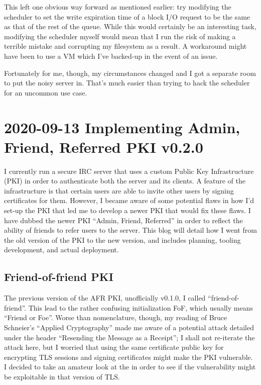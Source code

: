 \documentclass{article}
\begin{document}
This left one obvious way forward as mentioned earlier: try modifying the scheduler to set the write expiration time of a block I/O request to be the same as that of the rest of the queue.  While this would certainly be an interesting task, modifying the scheduler myself would mean that I run the risk of making a terrible mistake and corrupting my filesystem as a result.  A workaround might have been to use a VM which I've backed-up in the event of an issue.

Fortunately for me, though, my circumstances changed and I got a separate room to put the noisy server in.  That's much easier than trying to hack the scheduler for an uncommon use case.


\section{2020-09-13 Implementing Admin, Friend, Referred PKI v0.2.0}
I currently run a secure IRC server that uses a custom Public Key Infrastructure (PKI) in order to authenticate both the server and its clients.  A feature of the infrastructure is that certain users are able to invite other users by signing certificates for them.  However, I became aware of some potential flaws in how I'd set-up the PKI that led me to develop a newer PKI that would fix these flaws.  I have dubbed the newer PKI ``Admin, Friend, Referred'' in order to reflect the ability of friends to refer users to the server.  This blog will detail how I went from the old version of the PKI to the new version, and includes planning, tooling development, and actual deployment.

\subsection{Friend-of-friend PKI}
The previous version of the AFR PKI, unofficially v0.1.0, I called ``friend-of-friend''.  This lead to the rather confusing initialization FoF, which usually means ``Friend or Foe''.  Worse than nomenclature, though, my reading of Bruce Schneier's ``Applied Cryptography'' made me aware of a potential attack detailed under the header ``Resending the Message as a Receipt''; I shall not re-iterate the attack here, but I worried that using the same certificate public key for encrypting TLS sessions and signing certificates might make the PKI vulnerable.  I decided to take an amateur look at the  in order to see if the vulnerability might be exploitable in that version of TLS.
\end{document}
